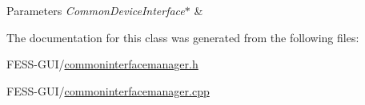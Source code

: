 \begin{DoxyParams}{Parameters}
{\em Common\+Device\+Interface$\ast$} & \\
\hline
\end{DoxyParams}


The documentation for this class was generated from the following files\+:\begin{DoxyCompactItemize}
\item 
F\+E\+S\+S-\/\+G\+U\+I/\hyperlink{commoninterfacemanager_8h}{commoninterfacemanager.\+h}\item 
F\+E\+S\+S-\/\+G\+U\+I/\hyperlink{commoninterfacemanager_8cpp}{commoninterfacemanager.\+cpp}\end{DoxyCompactItemize}
